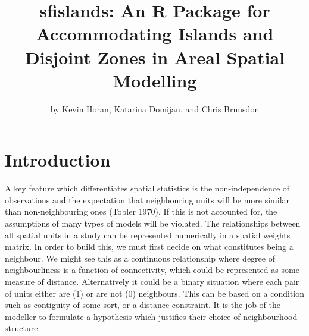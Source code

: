 \title{sfislands: An R Package for Accommodating Islands and Disjoint Zones in Areal Spatial Modelling}


\author{by Kevin Horan, Katarina Domijan, and Chris Brunsdon}

\maketitle


\hypertarget{introduction}{%
\section{Introduction}\label{introduction}}

A key feature which differentiates spatial statistics is the
non-independence of observations and the expectation that neighbouring
units will be more similar than non-neighbouring ones (Tobler 1970). If this
is not accounted for, the assumptions of many types of models will be
violated. The relationships between all spatial units in a study can be
represented numerically in a spatial weights matrix. In order to build
this, we must first decide on what constitutes being a neighbour. We might
see this as a continuous relationship where degree of neighbourliness is
a function of connectivity, which could be represented as some measure
of distance. Alternatively it could be a binary situation where each
pair of units either are (1) or are not (0) neighbours. This can be
based on a condition such as contiguity of some sort, or a distance
constraint. It is the job of the modeller to formulate a hypothesis
which justifies their choice of neighbourhood structure.

